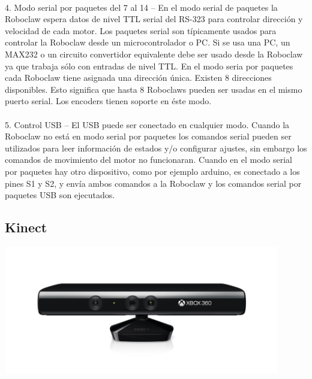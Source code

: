 \documentclass[a4paper]{book}
\begin{document}
\\
4. Modo serial por paquetes del 7 al 14 – En el modo serial de paquetes la Roboclaw espera datos de nivel TTL serial del RS-323 para controlar dirección y velocidad de cada motor. Los paquetes serial son típicamente usados para controlar la Roboclaw desde un microcontrolador o PC. Si se usa una PC, un MAX232 o un circuito convertidor equivalente debe ser usado desde la Roboclaw ya que trabaja sólo con entradas de nivel TTL. En el modo seria por paquetes cada Roboclaw tiene asignada una dirección única. Existen 8 direcciones disponibles. Esto significa que hasta 8 Roboclaws pueden ser usadas en el mismo puerto serial. Los encoders tienen soporte en éste modo.\\
\\
5. Control USB – El USB puede ser conectado en cualquier modo. Cuando la Roboclaw no está en modo serial por paquetes los comandos serial pueden ser utilizados para leer información de estados y/o configurar ajustes, sin embargo los comandos de movimiento del motor no funcionaran. Cuando en el modo serial por paquetes hay otro dispositivo, como por ejemplo arduino, es conectado a los pines S1 y S2, y envía ambos comandos a la Roboclaw y los comandos serial por paquetes USB son ejecutados.\\

\vfill

\subsection{Kinect}

\begin{center}
\includegraphics[width=0.9\textwidth]{Figures/Hardware/Partes/Kinect.png}
\label{fig:Hardware:Partes:Kinect}
\end{center}
\end{document}
